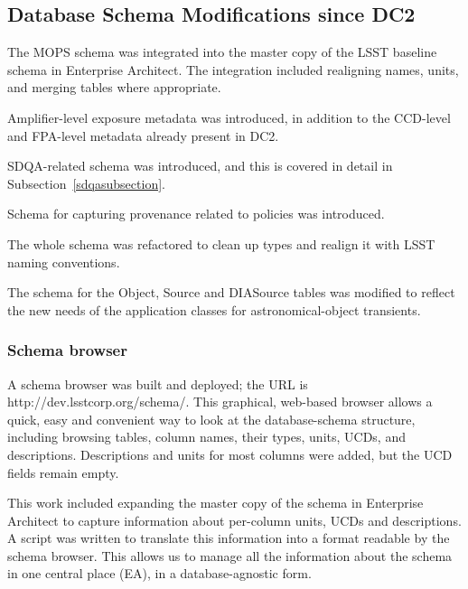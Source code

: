 
\subsection{Database Schema Modifications since DC2}


The MOPS schema was integrated into the master copy of the
LSST baseline schema in Enterprise Architect. The 
integration included realigning names, units, and 
merging tables where appropriate.


Amplifier-level exposure metadata was introduced,
in addition to the CCD-level and FPA-level metadata 
already present in DC2.


SDQA-related schema was introduced, and this is 
covered in detail in Subsection~\ref{sdqasubsection}.


Schema for capturing provenance related to policies
was introduced.


The whole schema was refactored to clean up types
and realign it with LSST naming conventions.


The schema for the Object, Source and DIASource tables 
was modified to reflect the new needs of the 
application classes for astronomical-object transients.


\subsubsection {Schema browser}

A schema browser was built and deployed; the URL is
http://dev.lsstcorp.org/schema/. This graphical, web-based
browser allows a quick, easy and convenient way to look
at the database-schema structure, including browsing tables, 
column names, their types, units, UCDs, and descriptions.
Descriptions and units for most columns were added, but
the UCD fields remain empty.

This work included expanding the master copy of the schema 
in Enterprise Architect to capture information 
about per-column units, UCDs and descriptions.
A script was written to translate this 
information into a format readable by the schema browser. 
This allows us to manage all the information about the schema 
in one central place (EA), in a database-agnostic form.



